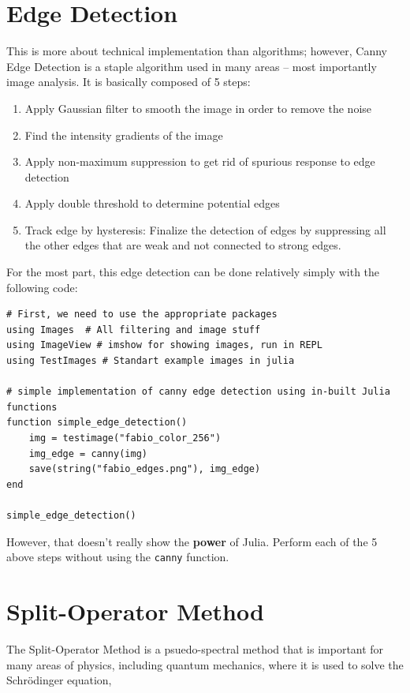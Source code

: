 \documentclass[11pt]{article}
\begin{document}
\section*{Edge Detection}
This is more about technical implementation than algorithms; however, Canny Edge Detection is a staple algorithm used in many areas -- most importantly image analysis. It is basically composed of 5 steps:
\begin{enumerate}
\item Apply Gaussian filter to smooth the image in order to remove the noise
\item Find the intensity gradients of the image
\item Apply non-maximum suppression to get rid of spurious response to edge detection
\item Apply double threshold to determine potential edges
\item Track edge by hysteresis: Finalize the detection of edges by suppressing all the other edges that are weak and not connected to strong edges.
\end{enumerate}

For the most part, this edge detection can be done relatively simply with the following code:

\begin{lstlisting}
# First, we need to use the appropriate packages
using Images  # All filtering and image stuff
using ImageView # imshow for showing images, run in REPL
using TestImages # Standart example images in julia

# simple implementation of canny edge detection using in-built Julia functions
function simple_edge_detection()
    img = testimage("fabio_color_256")
    img_edge = canny(img)
    save(string("fabio_edges.png"), img_edge)
end

simple_edge_detection()

\end{lstlisting}

However, that doesn't really show the \textbf{power} of Julia. Perform each of the 5 above steps without using the \texttt{canny} function.


\newpage
\section*{Split-Operator Method}
The Split-Operator Method is a psuedo-spectral method that is important for many areas of physics, including quantum mechanics, where it is used to solve the Schr\"odinger equation,
\end{document}
